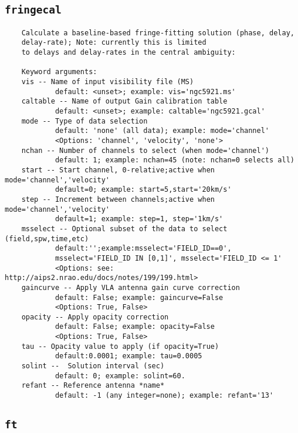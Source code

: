 \subsection{{\tt fringecal}}
\label{section:tasks.fringecal}

\small
\begin{verbatim}
    Calculate a baseline-based fringe-fitting solution (phase, delay,
    delay-rate); Note: currently this is limited  
    to delays and delay-rates in the central ambiguity:
    
    Keyword arguments:
    vis -- Name of input visibility file (MS)
            default: <unset>; example: vis='ngc5921.ms'
    caltable -- Name of output Gain calibration table
            default: <unset>; example: caltable='ngc5921.gcal'
    mode -- Type of data selection
            default: 'none' (all data); example: mode='channel'
            <Options: 'channel', 'velocity', 'none'>
    nchan -- Number of channels to select (when mode='channel')
            default: 1; example: nchan=45 (note: nchan=0 selects all)
    start -- Start channel, 0-relative;active when mode='channel','velocity'
            default=0; example: start=5,start='20km/s'
    step -- Increment between channels;active when mode='channel','velocity'
            default=1; example: step=1, step='1km/s'
    msselect -- Optional subset of the data to select (field,spw,time,etc)
            default:'';example:msselect='FIELD_ID==0', 
            msselect='FIELD_ID IN [0,1]', msselect='FIELD_ID <= 1'
            <Options: see: http://aips2.nrao.edu/docs/notes/199/199.html>
    gaincurve -- Apply VLA antenna gain curve correction
            default: False; example: gaincurve=False
            <Options: True, False>
    opacity -- Apply opacity correction
            default: False; example: opacity=False
            <Options: True, False>
    tau -- Opacity value to apply (if opacity=True)
            default:0.0001; example: tau=0.0005
    solint --  Solution interval (sec)
            default: 0; example: solint=60.
    refant -- Reference antenna *name*
            default: -1 (any integer=none); example: refant='13'
\end{verbatim}
\normalsize


\subsection{{\tt ft}}
\label{section:tasks.ft}

